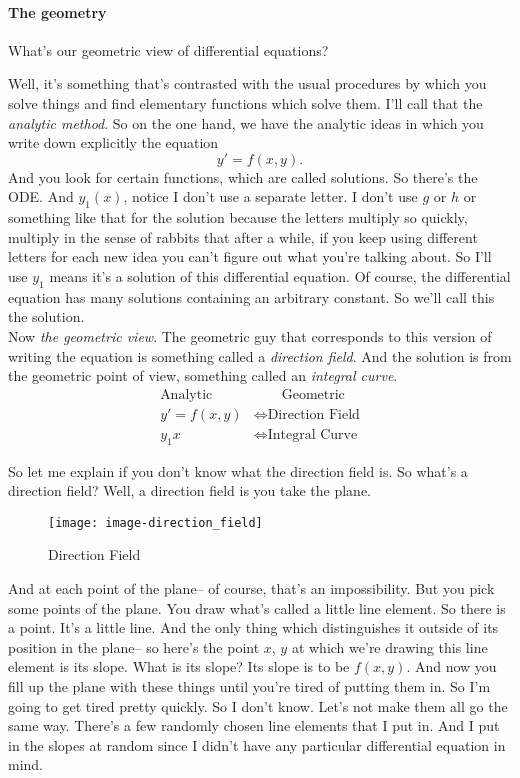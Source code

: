 \paragraph{The geometry}
What's our geometric view of differential equations?

Well, it's something that's contrasted
with the usual procedures by which you solve things and find
elementary functions which solve them.
I'll call that the \textit{analytic method}.
So on the one hand, we have the analytic ideas
in which you write down explicitly the equation
\begin{equation*}
  y' = f(x, y). 
\end{equation*}
And you look for certain functions, which are called solutions.
So there's the ODE.
And $y_1(x)$, notice I don't use a separate letter.
I don't use $g$ or $h$ or something like that for the solution
because the letters multiply so quickly,
multiply in the sense of rabbits that after a while, if you keep
using different letters for each new idea
you can't figure out what you're talking about.
So I'll use $y_1$ means it's a solution of this differential
equation.
Of course, the differential equation
has many solutions containing an arbitrary constant.
So we'll call this the solution.\\


Now \textit{the geometric view}.
The geometric guy that corresponds to this version of writing the equation
is something called a \textit{direction field}.
And the solution is from the geometric point of view,
something called an \textit{integral curve}.
\begin{align*}
  \text{Analytic}  &\qquad  \text{Geometric} \\
  y' = f(x,y) &\Longleftrightarrow \text{Direction Field} \\
  y_1 x &\Longleftrightarrow \text{Integral Curve}
\end{align*}


So let me explain if you don't know what the direction field is.
So what's a direction field?
Well, a direction field is you take the plane.

\begin{figure}[ht!]
  \centering
  \texttt{[image: image-direction\_field]}
  \caption{Direction Field}
\end{figure}

And at each point of the plane-- of course, that's an impossibility.
But you pick some points of the plane.
You draw what's called a little line element.
So there is a point.
It's a little line.
And the only thing which distinguishes it outside of its position in the plane--
so here's the point $x$, $y$ at which we're drawing this line element is its slope.
What is its slope?
Its slope is to be $f(x,y)$.
And now you fill up the plane with these things until you're tired of putting them in.
So I'm going to get tired pretty quickly.
So I don't know.
Let's not make them all go the same way.
There's a few randomly chosen line elements that I put in.
And I put in the slopes at random since I didn't have any particular differential
equation in mind.\\

